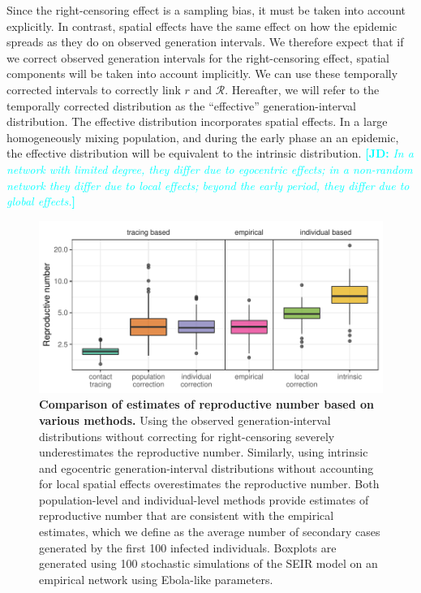 \documentclass[12pt]{article}
\newcommand{\RR}{\ensuremath{{\mathcal R}}}
\newcommand{\comment}[3]{\textcolor{#1}{\textbf{[#2: }\textsl{#3}\textbf{]}}}
\newcommand{\jd}[1]{\comment{cyan}{JD}{#1}}
\begin{document}
Since the right-censoring effect is a sampling bias, it must be taken into account explicitly.
In contrast, spatial effects have the same effect on how the epidemic spreads as they do on observed generation intervals. 
We therefore expect that if we correct observed generation intervals for the right-censoring effect, spatial components will be taken into account implicitly. 
We can use these temporally corrected intervals to correctly link $r$ and $\RR$.
Hereafter, we will refer to the temporally corrected distribution as the ``effective'' generation-interval distribution. 
The effective distribution incorporates spatial effects. 
In a large homogeneously mixing population, and during the early phase an an epidemic, the effective distribution will be equivalent to the intrinsic distribution.
\jd{In a network with limited degree, they differ due to egocentric effects; in a non-random network they differ due to local effects; beyond the early period, they differ due to global effects.}

\begin{figure}[ht]
\includegraphics[width=\textwidth]{../fig/cmp_reproductive.pdf}
\caption{\textbf{Comparison of estimates of reproductive number based on various methods.}
Using the observed generation-interval distributions without correcting for right-censoring severely underestimates the reproductive number.
Similarly, using intrinsic and egocentric generation-interval distributions without accounting for local spatial effects overestimates the reproductive number.
Both population-level and individual-level methods provide estimates of reproductive number that are consistent with the empirical estimates, which we define as the average number of secondary cases generated by the first 100 infected individuals.
Boxplots are generated using 100 stochastic simulations of the SEIR model on an empirical network using Ebola-like parameters.
}
\label{fig:cmp}
\end{figure}
\end{document}
